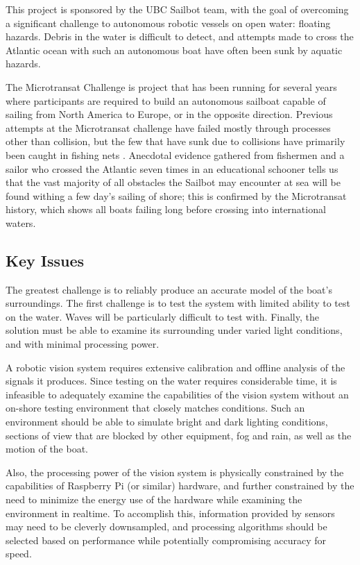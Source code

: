 This project is sponsored by the UBC Sailbot team, with the goal of overcoming a significant challenge to autonomous robotic vessels on open water: floating hazards. Debris in the water is difficult to detect, and attempts made to cross the Atlantic ocean with such an autonomous boat have often been sunk by aquatic hazards.

The Microtransat Challenge \cite{transat-history} is project that has been running for several years where participants are required to build an autonomous sailboat capable of sailing from North America to Europe, or in the opposite direction. Previous attempts at the Microtransat challenge have failed mostly through processes other than collision, but the few that have sunk due to collisions have primarily been caught in fishing nets \cite{transat-history}. Anecdotal evidence gathered from fishermen and a sailor who crossed the Atlantic seven times in an educational schooner tells us that the vast majority of all obstacles the Sailbot may encounter at sea will be found withing a few day's sailing of shore; this is confirmed by the Microtransat history, which shows all boats failing long before crossing into international waters.


\subsection{\label{sec:intro:key-issues}Key Issues}
The greatest challenge is to reliably produce an accurate model of the boat's surroundings. The first challenge is to test the system with limited ability to test on the water.  Waves will be particularly difficult to test with.  Finally, the solution must be able to examine its surrounding under varied light conditions, and with minimal processing power.

A robotic vision system requires extensive calibration and offline analysis of the signals it produces. Since testing on the water requires considerable time, it is infeasible to adequately examine the capabilities of the vision system without an on-shore testing environment that closely matches conditions. Such an environment should be able to simulate bright and dark lighting conditions, sections of view that are blocked by other equipment, fog and rain, as well as the motion of the boat.

Also, the processing power of the vision system is physically constrained by the capabilities of Raspberry Pi (or similar) hardware, and further constrained by the need to minimize the energy use of the hardware while examining the environment in realtime. To accomplish this, information provided by sensors may need to be cleverly downsampled, and processing algorithms should be selected based on performance while potentially compromising accuracy for speed.


